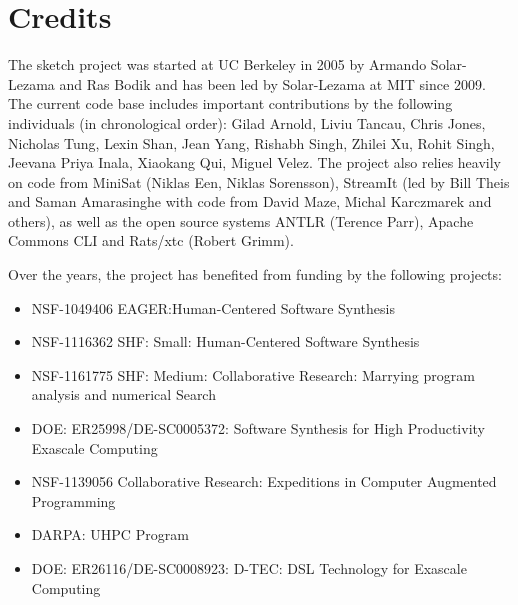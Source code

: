 \section{Credits}

The sketch project was started at UC Berkeley in 2005 by Armando Solar-Lezama and Ras Bodik and has been led by Solar-Lezama at MIT since 2009. The current code base includes important contributions by the following individuals (in chronological order): 
Gilad Arnold,
Liviu Tancau,
Chris Jones,
Nicholas Tung,
Lexin Shan,
Jean Yang,
Rishabh Singh,
Zhilei Xu,
Rohit Singh,
Jeevana Priya Inala,
Xiaokang Qui,
Miguel Velez.
The project also relies heavily on code from MiniSat (Niklas Een, Niklas Sorensson), StreamIt (led by Bill Theis and Saman Amarasinghe with code from David Maze, Michal Karczmarek and others), as well as the open source systems ANTLR (Terence Parr), Apache Commons CLI and Rats/xtc (Robert Grimm).

Over the years, the project has benefited from funding by the following projects:
\begin{itemize}
\item NSF-1049406 EAGER:Human-Centered Software Synthesis
\item NSF-1116362  SHF: Small: Human-Centered Software Synthesis
\item NSF-1161775 SHF: Medium: Collaborative Research: Marrying program analysis and numerical Search
\item DOE: ER25998/DE-SC0005372: Software Synthesis for High Productivity Exascale Computing
\item NSF-1139056 Collaborative Research: Expeditions in Computer Augmented Programming
\item DARPA: UHPC Program
\item DOE: ER26116/DE-SC0008923: D-TEC: DSL Technology for Exascale Computing 
\end{itemize}
